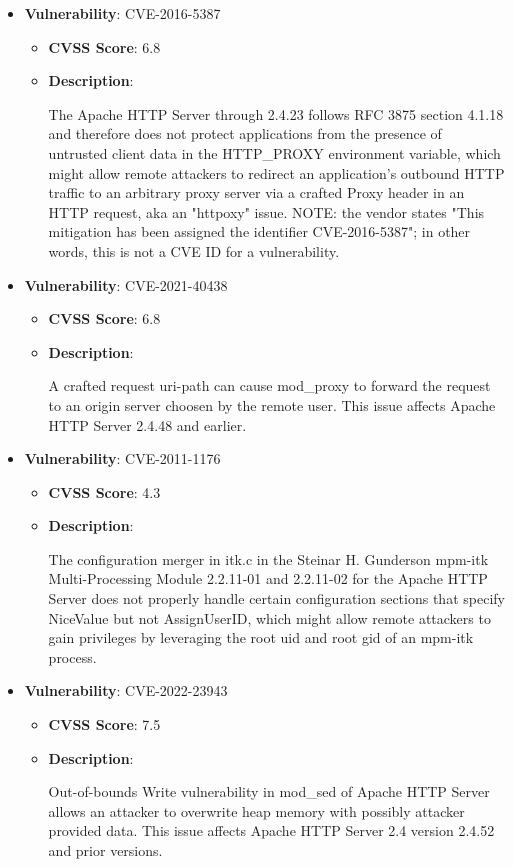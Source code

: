 \documentclass{article}
\begin{document}
\begin{itemize}
        \item \textbf{Vulnerability}: CVE-2016-5387
        \begin{itemize}
            \item \textbf{CVSS Score}:  6.8 
            \item \textbf{Description}:
            \parbox[t]{0.9\linewidth}{
                \ttfamily The Apache HTTP Server through 2.4.23 follows RFC 3875 section 4.1.18 and therefore does not protect applications from the presence of untrusted client data in the HTTP\_PROXY environment variable, which might allow remote attackers to redirect an application's outbound HTTP traffic to an arbitrary proxy server via a crafted Proxy header in an HTTP request, aka an "httpoxy" issue.  NOTE: the vendor states "This mitigation has been assigned the identifier CVE-2016-5387"; in other words, this is not a CVE ID for a vulnerability.
            }
        \end{itemize}
    
        \item \textbf{Vulnerability}: CVE-2021-40438
        \begin{itemize}
            \item \textbf{CVSS Score}:  6.8 
            \item \textbf{Description}:
            \parbox[t]{0.9\linewidth}{
                \ttfamily A crafted request uri-path can cause mod\_proxy to forward the request to an origin server choosen by the remote user. This issue affects Apache HTTP Server 2.4.48 and earlier.
            }
        \end{itemize}
    
        \item \textbf{Vulnerability}: CVE-2011-1176
        \begin{itemize}
            \item \textbf{CVSS Score}:  4.3 
            \item \textbf{Description}:
            \parbox[t]{0.9\linewidth}{
                \ttfamily The configuration merger in itk.c in the Steinar H. Gunderson mpm-itk Multi-Processing Module 2.2.11-01 and 2.2.11-02 for the Apache HTTP Server does not properly handle certain configuration sections that specify NiceValue but not AssignUserID, which might allow remote attackers to gain privileges by leveraging the root uid and root gid of an mpm-itk process.
            }
        \end{itemize}
    
        \item \textbf{Vulnerability}: CVE-2022-23943
        \begin{itemize}
            \item \textbf{CVSS Score}:  7.5 
            \item \textbf{Description}:
            \parbox[t]{0.9\linewidth}{
                \ttfamily Out-of-bounds Write vulnerability in mod\_sed of Apache HTTP Server allows an attacker to overwrite heap memory with possibly attacker provided data. This issue affects Apache HTTP Server 2.4 version 2.4.52 and prior versions.
            }
        \end{itemize}
    

\end{itemize}
\end{document}
